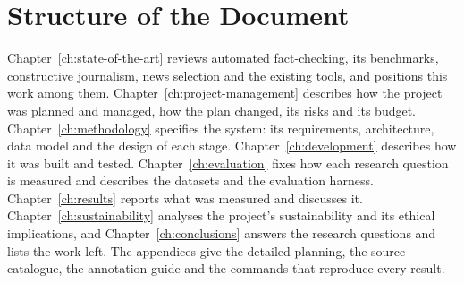 
\section{Structure of the Document}
\label{sec:structure}

Chapter~\ref{ch:state-of-the-art} reviews automated fact-checking, its
benchmarks, constructive journalism, news selection and the existing
tools, and positions this work among them.
Chapter~\ref{ch:project-management} describes how the project was
planned and managed, how the plan changed, its risks and its budget.
Chapter~\ref{ch:methodology} specifies the system: its requirements,
architecture, data model and the design of each stage.
Chapter~\ref{ch:development} describes how it was built and tested.
Chapter~\ref{ch:evaluation} fixes how each research question is
measured and describes the datasets and the evaluation harness.
Chapter~\ref{ch:results} reports what was measured and discusses it.
Chapter~\ref{ch:sustainability} analyses the project's sustainability
and its ethical implications, and Chapter~\ref{ch:conclusions} answers
the research questions and lists the work left. The appendices give
the detailed planning, the source catalogue, the annotation guide and
the commands that reproduce every result.
